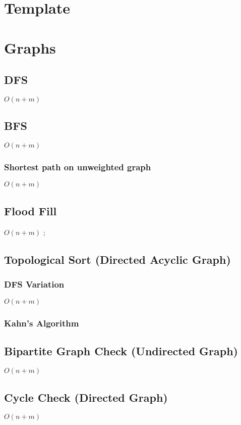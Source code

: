 \documentclass{article}
\begin{document}
\tableofcontents 

\section{Template}

\section{Graphs}
\subsection{DFS}
$O(n+m)$


\subsection{BFS}
$O(n+m)$


\subsubsection{Shortest path on unweighted graph}
$O(n+m)$


\subsection{Flood Fill}
$O(n+m)$
;

\subsection{Topological Sort (Directed Acyclic Graph)}
\subsubsection{DFS Variation}
$O(n+m)$


\subsubsection{Kahn's Algorithm}


\subsection{Bipartite Graph Check (Undirected Graph)}
$O(n+m)$


\subsection{Cycle Check (Directed Graph)}
$O(n+m)$

\end{document}
